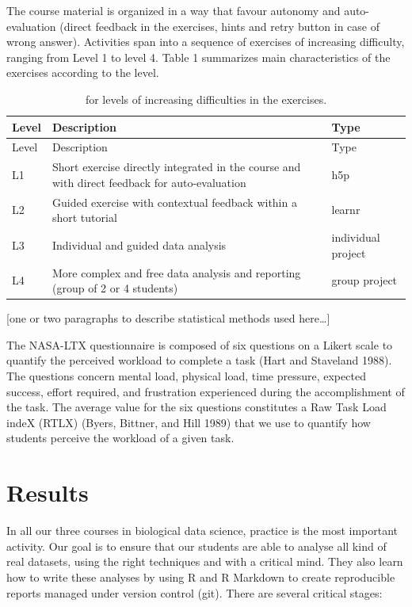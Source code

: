 \documentclass[
]{article}
\begin{document}
The course material is organized in a way that favour autonomy and
auto-evaluation (direct feedback in the exercises, hints and retry
button in case of wrong answer). Activities span into a sequence of
exercises of increasing difficulty, ranging from Level 1 to level 4.
Table 1 summarizes main characteristics of the exercises according to
the level.

\begin{longtable}[]{@{}
  >{\raggedright\arraybackslash}p{}
  >{\raggedright\arraybackslash}p{}
  >{\raggedright\arraybackslash}p{}@{}}
\caption{for levels of increasing difficulties in the
exercises.}\tabularnewline
\toprule
Level & Description & Type \\
\midrule
\endfirsthead
\toprule
Level & Description & Type \\
\midrule
\endhead
L1 & Short exercise directly integrated in the course and with direct
feedback for auto-evaluation & h5p \\
L2 & Guided exercise with contextual feedback within a short tutorial &
learnr \\
L3 & Individual and guided data analysis & individual project \\
L4 & More complex and free data analysis and reporting (group of 2 or 4
students) & group project \\
\bottomrule
\end{longtable}

{[}one or two paragraphs to describe statistical methods used
here\ldots{]}

The NASA-LTX questionnaire is composed of six questions on a Likert
scale to quantify the perceived workload to complete a task (Hart and
Staveland 1988). The questions concern mental load, physical load, time
pressure, expected success, effort required, and frustration experienced
during the accomplishment of the task. The average value for the six
questions constitutes a Raw Task Load indeX (RTLX) (Byers, Bittner, and
Hill 1989) that we use to quantify how students perceive the workload of
a given task.

\hypertarget{results}{%
\section{Results}\label{results}}

In all our three courses in biological data science, practice is the
most important activity. Our goal is to ensure that our students are
able to analyse all kind of real datasets, using the right techniques
and with a critical mind. They also learn how to write these analyses by
using R and R Markdown to create reproducible reports managed under
version control (git). There are several critical stages:
\end{document}
